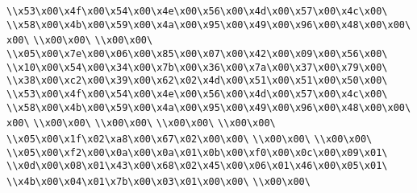 \verb|\\x53\x00\x4f\x00\x54\x00\x4e\x00\x56\x00\x4d\x00\x57\x00\x4c\x00\|\newline
\verb|\\x58\x00\x4b\x00\x59\x00\x4a\x00\x95\x00\x49\x00\x96\x00\x48\x00\x00\x00\|\newline
\verb|\\x00\x00\|\newline
\verb|\\x00\x00\|\newline
\verb|\\x05\x00\x7e\x00\x06\x00\x85\x00\x07\x00\x42\x00\x09\x00\x56\x00\|\newline
\verb|\\x10\x00\x54\x00\x34\x00\x7b\x00\x36\x00\x7a\x00\x37\x00\x79\x00\|\newline
\verb|\\x38\x00\xc2\x00\x39\x00\x62\x02\x4d\x00\x51\x00\x51\x00\x50\x00\|\newline
\verb|\\x53\x00\x4f\x00\x54\x00\x4e\x00\x56\x00\x4d\x00\x57\x00\x4c\x00\|\newline
\verb|\\x58\x00\x4b\x00\x59\x00\x4a\x00\x95\x00\x49\x00\x96\x00\x48\x00\x00\x00\|\newline
\verb|\\x00\x00\|\newline
\verb|\\x00\x00\|\newline
\verb|\\x00\x00\|\newline
\verb|\\x00\x00\|\newline
\verb|\\x05\x00\x1f\x02\xa8\x00\x67\x02\x00\x00\|\newline
\verb|\\x00\x00\|\newline
\verb|\\x00\x00\|\newline
\verb|\\x05\x00\xf2\x00\x0a\x00\x0a\x01\x0b\x00\xf0\x00\x0c\x00\x09\x01\|\newline
\verb|\\x0d\x00\x08\x01\x43\x00\x68\x02\x45\x00\x06\x01\x46\x00\x05\x01\|\newline
\verb|\\x4b\x00\x04\x01\x7b\x00\x03\x01\x00\x00\|\newline
\verb|\\x00\x00\|\newline
